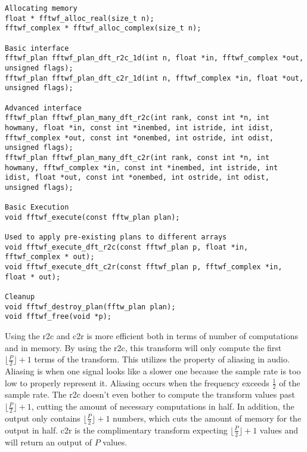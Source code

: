 \begin{verbatim}
Allocating memory
float * fftwf_alloc_real(size_t n);
fftwf_complex * fftwf_alloc_complex(size_t n);

Basic interface
fftwf_plan fftwf_plan_dft_r2c_1d(int n, float *in, fftwf_complex *out, unsigned flags);
fftwf_plan fftwf_plan_dft_c2r_1d(int n, fftwf_complex *in, float *out, unsigned flags);

Advanced interface
fftwf_plan fftwf_plan_many_dft_r2c(int rank, const int *n, int howmany, float *in, const int *inembed, int istride, int idist, fftwf_complex *out, const int *onembed, int ostride, int odist, unsigned flags);
fftwf_plan fftwf_plan_many_dft_c2r(int rank, const int *n, int howmany, fftwf_complex *in, const int *inembed, int istride, int idist, float *out, const int *onembed, int ostride, int odist, unsigned flags);

Basic Execution
void fftwf_execute(const fftw_plan plan);

Used to apply pre-existing plans to different arrays 
void fftwf_execute_dft_r2c(const fftwf_plan p, float *in, fftwf_complex * out);
void fftwf_execute_dft_c2r(const fftwf_plan p, fftwf_complex *in, float * out);

Cleanup
void fftwf_destroy_plan(fftw_plan plan);
void fftwf_free(void *p);
\end{verbatim}
Using the r2c and c2r is more efficient both in terms of number of computations and in memory. By using the r2c, this transform will only compute the first $\lfloor\frac{P}{2}\rfloor + 1$ terms of the transform. This utilizes the property of aliasing in audio. Aliasing is when one signal looks like a slower one because the sample rate is too low to properly represent it. Aliasing occurs when the frequency exceeds $\frac{1}{2}$ of the sample rate. The r2c doesn't even bother to compute the transform values past $\lfloor\frac{P}{2}\rfloor + 1$, cutting the amount of necessary computations in half. In addition, the output only contains  $\lfloor\frac{P}{2}\rfloor + 1$ numbers, which cuts the amount of memory for the output in half. c2r is the complimentary transform expecting $\lfloor\frac{P}{2}\rfloor + 1$ values and will return an output of $P$ values. 


\begin{changemargin}
\def\excerpt{\thispagestyle{empty} \paragraph{Frequency Domain Convolution Algorithm} \hspace{0pt} \\}

\end{changemargin}

